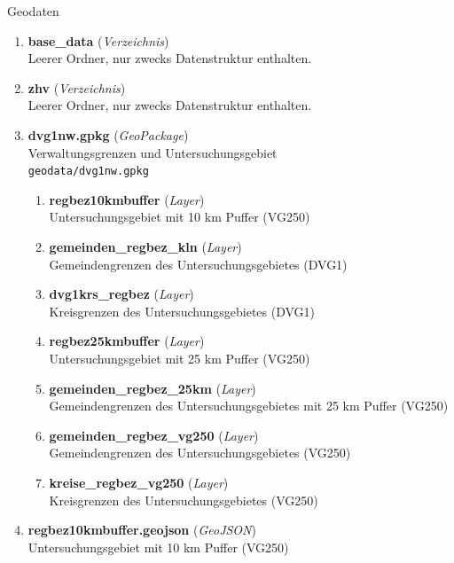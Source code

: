 \begin{enumerate}[label=\arabic*., leftmargin=*, itemsep=0.5em, topsep=0.3em]
Geodaten
\begin{enumerate}[label=\arabic{enumi}.\arabic*, leftmargin=*, itemsep=0.5em, topsep=0.3em]
\item \textbf{base\_data} \textnormal{(\textit{Verzeichnis})}\\
Leerer Ordner, nur zwecks Datenstruktur enthalten.
\item \textbf{zhv} \textnormal{(\textit{Verzeichnis})}\\
Leerer Ordner, nur zwecks Datenstruktur enthalten.
\item \textbf{dvg1nw.gpkg} \textnormal{(\textit{GeoPackage})}\\
Verwaltungsgrenzen und Untersuchungsgebiet\\
\texttt{\small geodata/dvg1nw.gpkg}
\begin{enumerate}[label=\arabic{enumi}.\arabic{enumii}.\arabic*, leftmargin=*, itemsep=0.5em, topsep=0.3em]
\item \textbf{regbez10kmbuffer} \textnormal{(\textit{Layer})}\\
Untersuchungsgebiet mit 10 km Puffer (VG250)
\item \textbf{gemeinden\_regbez\_kln} \textnormal{(\textit{Layer})}\\
Gemeindengrenzen des Untersuchungsgebietes (DVG1)
\item \textbf{dvg1krs\_regbez} \textnormal{(\textit{Layer})}\\
Kreisgrenzen des Untersuchungsgebietes (DVG1)
\item \textbf{regbez25kmbuffer} \textnormal{(\textit{Layer})}\\
Untersuchungsgebiet mit 25 km Puffer (VG250)
\item \textbf{gemeinden\_regbez\_25km} \textnormal{(\textit{Layer})}\\
Gemeindengrenzen des Untersuchungsgebietes mit 25 km Puffer (VG250)
\item \textbf{gemeinden\_regbez\_vg250} \textnormal{(\textit{Layer})}\\
Gemeindengrenzen des Untersuchungsgebietes (VG250)
\item \textbf{kreise\_regbez\_vg250} \textnormal{(\textit{Layer})}\\
Kreisgrenzen des Untersuchungsgebietes (VG250)
\end{enumerate}
\item \textbf{regbez10kmbuffer.geojson} \textnormal{(\textit{GeoJSON})}\\
Untersuchungsgebiet mit 10 km Puffer (VG250)\\

\end{enumerate}
\end{enumerate}
